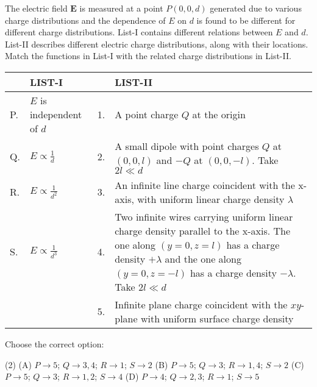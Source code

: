 
    \item The electric field $\mathbf{E}$ is measured at a point $P(0,0,d)$ generated due to various charge distributions and the dependence of $E$ on $d$ is found to be different for different charge distributions. List-I contains different relations between $E$ and $d$. List-II describes different electric charge distributions, along with their locations. Match the functions in List-I with the related charge distributions in List-II.
    \begin{center}
        \renewcommand{\arraystretch}{1.5}
        \begin{table}[h]
            \centering
            \begin{tabular}{p{0.25cm}p{4cm}|p{0.25cm}p{9cm}}
            \hline
            & LIST-I & & LIST-II \\
            \hline
            P. & $E$ is independent of $d$ & 1. & A point charge $Q$ at the origin \\
            Q. & $E \propto \frac{1}{d}$ & 2. & A small dipole with point charges $Q$ at $(0,0,l)$ and $-Q$ at $(0,0,-l)$. Take $2l \ll d$ \\
            R. & $E \propto \frac{1}{d^2}$ & 3. & An infinite line charge coincident with the x-axis, with uniform linear charge density $\lambda$ \\
            S. & $E \propto \frac{1}{d^3}$ & 4. & Two infinite wires carrying uniform linear charge density parallel to the x-axis. The one along $(y=0, z=l)$ has a charge density $+\lambda$ and the one along $(y=0, z=-l)$ has a charge density $-\lambda$. Take $2l \ll d$\\
            & & 5. & Infinite plane charge coincident with the $xy$-plane with uniform surface charge density \\
            \hline
            \end{tabular}
        \end{table}
    \end{center}
     Choose the correct option:
        \begin{tasks}(2)
            \task (A) $P \rightarrow 5$; $Q \rightarrow 3, 4$; $R \rightarrow 1$; $S \rightarrow 2$
            \task (B) $P \rightarrow 5$; $Q \rightarrow 3$; $R \rightarrow 1, 4$; $S \rightarrow 2$
            \task (C) $P \rightarrow 5$; $Q \rightarrow 3$; $R \rightarrow 1, 2$; $S \rightarrow 4$
            \task (D) $P \rightarrow 4$; $Q \rightarrow 2, 3$; $R \rightarrow 1$; $S \rightarrow 5$
        \end{tasks}

